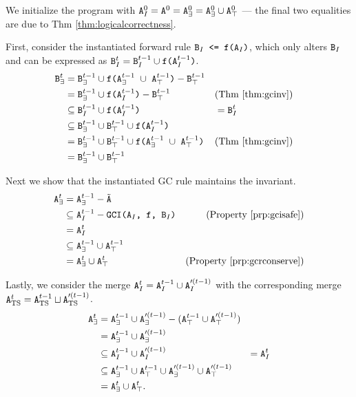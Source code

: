 \documentclass[10pt]{proc}
\newenvironment{proof}[1][Proof]{\begin{trivlist}\item[\hskip \labelsep {\textit {#1:}}]}{\end{trivlist}}
\renewcommand{\tt}[1]{\ifmmode\text{\texttt{#1}}\else\texttt{#1}\fi}
\begin{document}
\begin{proof}
We initialize the program with $\tt{A}_I^0 = \tt{A}^0 = \tt{A}_\exists^0 = \tt{A}_\exists^0 \cup \tt{A}_\top^0$ --- the final two equalities are due to Thm \ref{thm:logicalcorrectness}.

First, consider the instantiated forward rule $\tt{B}_I \tt{ <= f(A$_I$)}$, which only alters $\tt{B}_I$ and can be expressed as $\tt{B}_I^t = \tt{B}_I^{t-1} \cup \tt{f(A$_I^{t-1}$)}$.
\begin{align*}
\tt{B}_\exists^t
&= \tt{B}_\exists^{t-1} \cup \tt{f(A$_\exists^{t-1}$ $\cup$ A$_\top^{t-1}$)} - \tt{B}_\top^{t-1}\\
&= \tt{B}_\exists^{t-1} \cup \tt{f(A$_I^{t-1}$)} - \tt{B}_\top^{t-1} && \text{(Thm \ref{thm:gcinv})} \\
&\subseteq \tt{B}_I^{t-1} \cup \tt{f(A$_I^{t-1}$)}
&&= \tt{B}_I^t\\
&\subseteq \tt{B}_\exists^{t-1} \cup \tt{B}_\top^{t-1} \cup \tt{f(A$_I^{t-1}$)}\\
&=\tt{B}_\exists^{t-1} \cup \tt{B}_\top^{t-1} \cup \tt{f(A$_\exists^{t-1}$ $\cup$ A$_\top^{t-1}$)} && \text{(Thm \ref{thm:gcinv})}\\
&=\tt{B}_\exists^{t-1} \cup \tt{B}_\top^{t-1}
\end{align*}

Next we show that the instantiated GC rule maintains the invariant.
\begin{align*}
\tt{A}_\exists^t 
&= \tt{A}_\exists^{t-1} - \tilde{\tt{A}}\\
&\subseteq \tt{A}_I^{t-1} - \tt{GCI(A$_I$, f, B$_I$)} & \text{(Property \ref{prp:gcisafe})}\\
&= \tt{A}_I^t\\
&\subseteq \tt{A}_\exists^{t-1} \cup \tt{A}_\top^{t-1}\\
&= \tt{A}_\exists^t \cup \tt{A}_\top^t & \text{(Property \ref{prp:gcrconserve})}
\end{align*}

Lastly, we consider the merge $\tt{A}_I^t = \tt{A}_I^{t-1} \cup \tt{A}_I^{\prime(t-1)}$ with the corresponding merge $\tt{A}_\text{TS}^t = \tt{A}_\text{TS}^{t-1} \sqcup \tt{A}_\text{TS}^{\prime(t-1)}$.
\begin{align*}
\tt{A}_\exists^t
&= \tt{A}_\exists^{t-1} \cup \tt{A}_\exists^{\prime(t-1)} - (\tt{A}_\top^{t-1} \cup \tt{A}_\top^{\prime(t-1)})\\
&= \tt{A}_\exists^{t-1} \cup \tt{A}_\exists^{\prime(t-1)}\\
&\subseteq \tt{A}_I^{t-1} \cup \tt{A}_I^{\prime(t-1)}
&= \tt{A}_I^t\\
&\subseteq \tt{A}_\exists^{t-1} \cup \tt{A}_\top^{t-1} \cup \tt{A}_\exists^{\prime(t-1)} \cup \tt{A}_\top^{\prime(t-1)}\\
&= \tt{A}_\exists^t \cup \tt{A}_\top^t.
\end{align*}


\end{proof}
\end{document}
